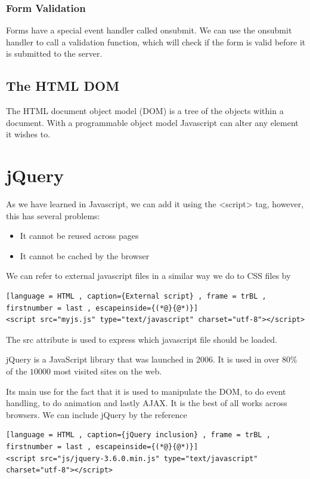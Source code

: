\documentclass[a4paper]{article}
\theoremstyle{plain}
\theoremstyle{definition}
\newtheorem{defn}{Definition}[section]
\theoremstyle{remark}
\begin{document}
\begin{flushleft}
\subsubsection{Form Validation}
Forms have a special event handler called onsubmit. We can use the onsubmit handler to call a validation function, which will check if the form is valid before it is submitted to the server. 
\subsection{The HTML DOM}
The HTML document object model (DOM) is a tree of the objects within a document. With a programmable object model Javascript can alter any element it wishes to.
\section{jQuery}
As we have learned in Javascript, we can add it using the <script> tag, however, this has several problems:
\begin{itemize}
	\item It cannot be reused across pages
	\item It cannot be cached by the browser
\end{itemize}
We can refer to external javascript files in a similar way we do to CSS files by
\begin{lstlisting}[language = HTML , caption={External script} , frame = trBL , firstnumber = last , escapeinside={(*@}{@*)}]
<script src="myjs.js" type="text/javascript" charset="utf-8"></script>
\end{lstlisting}
The src attribute is used to express which javascript file should be loaded.
\begin{tcolorbox}[colback=black!3!white,colframe=black!60!white,title=\begin{defn}jQuery \label{jQuery}\end{defn}]
jQuery is a JavaScript library that was launched in 2006. It is used in over $80\%$ of the $10000$ most visited sites on the web.
\end{tcolorbox}
Its main use for the fact that it is used to manipulate the DOM, to do event handling, to do animation and lastly AJAX. It is the best of all works across browsers. We can include jQuery by the reference
\begin{lstlisting}[language = HTML , caption={jQuery inclusion} , frame = trBL , firstnumber = last , escapeinside={(*@}{@*)}]
<script src="js/jquery-3.6.0.min.js" type="text/javascript" charset="utf-8"></script>

\end{lstlisting}
\end{flushleft}
\end{document}
